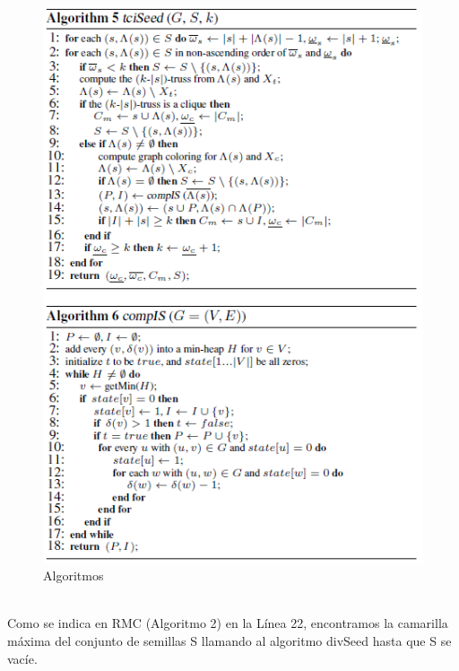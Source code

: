 \begin{figure}[h!]
\centering
\includegraphics[scale=1]{img/imagen16.png}
\caption{Algoritmos}
\label{Comandos}
\end{figure}
\\
Como se indica en RMC (Algoritmo 2) en la Línea 22, encontramos la camarilla máxima del conjunto de semillas S llamando al algoritmo divSeed hasta que S se vacíe.
